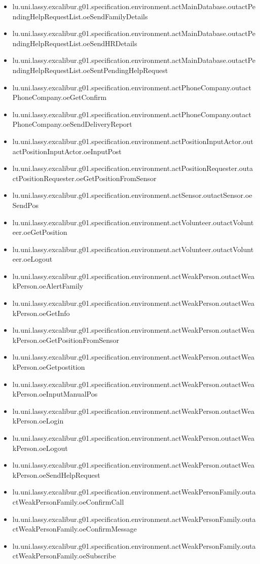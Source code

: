 \begin{itemize}
\item lu.uni.lassy.excalibur.g01.specification.environment.actMainDatabase.outactPendingHelpRequestList.oeSendFamilyDetails 
\item lu.uni.lassy.excalibur.g01.specification.environment.actMainDatabase.outactPendingHelpRequestList.oeSendHRDetails 
\item lu.uni.lassy.excalibur.g01.specification.environment.actMainDatabase.outactPendingHelpRequestList.oeSentPendingHelpRequest 
\item lu.uni.lassy.excalibur.g01.specification.environment.actPhoneCompany.outactPhoneCompany.oeGetConfirm 
\item lu.uni.lassy.excalibur.g01.specification.environment.actPhoneCompany.outactPhoneCompany.oeSendDeliveryReport 
\item lu.uni.lassy.excalibur.g01.specification.environment.actPositionInputActor.outactPositionInputActor.oeInputPost 
\item lu.uni.lassy.excalibur.g01.specification.environment.actPositionRequester.outactPositionRequester.oeGetPositionFromSensor 
\item lu.uni.lassy.excalibur.g01.specification.environment.actSensor.outactSensor.oeSendPos 
\item lu.uni.lassy.excalibur.g01.specification.environment.actVolunteer.outactVolunteer.oeGetPosition 
\item lu.uni.lassy.excalibur.g01.specification.environment.actVolunteer.outactVolunteer.oeLogout 
\item lu.uni.lassy.excalibur.g01.specification.environment.actWeakPerson.outactWeakPerson.oeAlertFamily 
\item lu.uni.lassy.excalibur.g01.specification.environment.actWeakPerson.outactWeakPerson.oeGetInfo 
\item lu.uni.lassy.excalibur.g01.specification.environment.actWeakPerson.outactWeakPerson.oeGetPositionFromSensor 
\item lu.uni.lassy.excalibur.g01.specification.environment.actWeakPerson.outactWeakPerson.oeGetpostition 
\item lu.uni.lassy.excalibur.g01.specification.environment.actWeakPerson.outactWeakPerson.oeInputManualPos 
\item lu.uni.lassy.excalibur.g01.specification.environment.actWeakPerson.outactWeakPerson.oeLogin 
\item lu.uni.lassy.excalibur.g01.specification.environment.actWeakPerson.outactWeakPerson.oeLogout 
\item lu.uni.lassy.excalibur.g01.specification.environment.actWeakPerson.outactWeakPerson.oeSendHelpRequest 
\item lu.uni.lassy.excalibur.g01.specification.environment.actWeakPersonFamily.outactWeakPersonFamily.oeConfirmCall 
\item lu.uni.lassy.excalibur.g01.specification.environment.actWeakPersonFamily.outactWeakPersonFamily.oeConfirmMessage 
\item lu.uni.lassy.excalibur.g01.specification.environment.actWeakPersonFamily.outactWeakPersonFamily.oeSubscribe 
\end{itemize}








